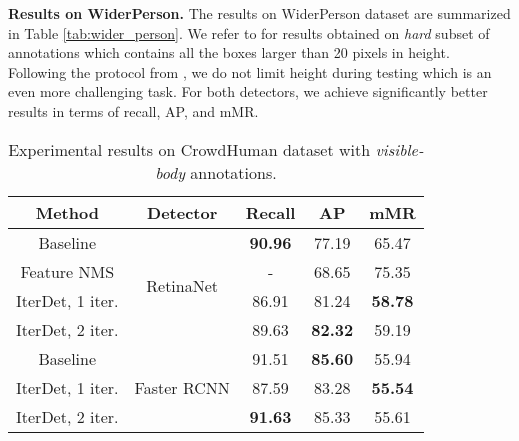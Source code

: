 \documentclass[runningheads]{llncs}
\begin{document}
\textbf{Results on WiderPerson.} The results on WiderPerson dataset are summarized in Table \ref{tab:wider_person}. We refer to \cite{zhang2019widerperson} for results obtained on \emph{hard} subset of annotations which contains all the boxes larger than 20 pixels in height. Following the protocol from \cite{ge2020ps}, we do not limit height during testing which is an even more challenging task. For both detectors, we achieve significantly better results in terms of recall, AP, and mMR.

\begin{table*}[h!]
    \centering
    \begin{tabular}{c|c|ccc}
        \hline
        Method & Detector & Recall & AP & mMR  \\ \hline \hline
        Baseline \cite{shao2018crowdhuman} & \multirow{4}{*}{RetinaNet} & \textbf{90.96} & 77.19 & 65.47 \\
        Feature NMS \cite{salscheider2020featurenms} && - & 68.65 & 75.35 \\ \cline{1-1} \cline{3-5}
        IterDet, 1 iter. && 86.91 & 81.24 & \textbf{58.78} \\
        IterDet, 2 iter. && 89.63 & \textbf{82.32} & 59.19 \\ \hline \hline
        Baseline \cite{shao2018crowdhuman} & \multirow{3}{*}{Faster RCNN} & 91.51 & \textbf{85.60} & 55.94 \\ \cline{1-1} \cline{3-5}
        IterDet, 1 iter. && 87.59 & 83.28 & \textbf{55.54} \\
        IterDet, 2 iter. && \textbf{91.63} & 85.33 & 55.61 \\ \hline
    \end{tabular}
    \caption{Experimental results on CrowdHuman dataset with \emph{visible-body}  annotations.}
    \label{tab:crowd_human_visible}
\end{table*}
\end{document}
